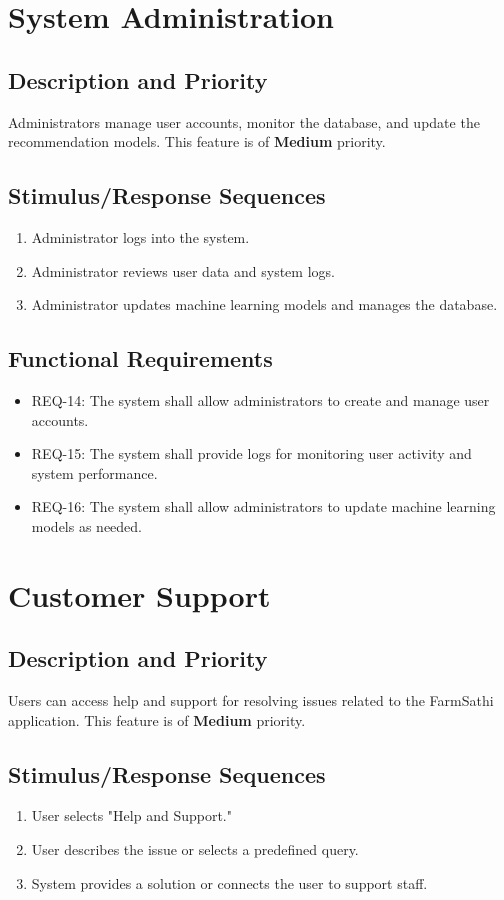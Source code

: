 \documentclass{scrreprt}
\begin{document}
\section{System Administration}
\subsection{Description and Priority}
Administrators manage user accounts, monitor the database, and update the recommendation models. This feature is of \textbf{Medium} priority.
\subsection{Stimulus/Response Sequences}
\begin{enumerate}
    \item Administrator logs into the system.
    \item Administrator reviews user data and system logs.
    \item Administrator updates machine learning models and manages the database.
\end{enumerate}
\subsection{Functional Requirements}
\begin{itemize}
    \item REQ-14: The system shall allow administrators to create and manage user accounts.
    \item REQ-15: The system shall provide logs for monitoring user activity and system performance.
    \item REQ-16: The system shall allow administrators to update machine learning models as needed.
\end{itemize}

\section{Customer Support}
\subsection{Description and Priority}
Users can access help and support for resolving issues related to the FarmSathi application. This feature is of \textbf{Medium} priority.
\subsection{Stimulus/Response Sequences}
\begin{enumerate}
    \item User selects "Help and Support."
    \item User describes the issue or selects a predefined query.
    \item System provides a solution or connects the user to support staff.
\end{enumerate}
\end{document}
